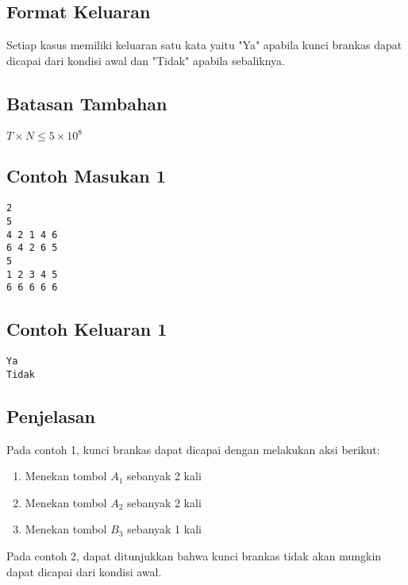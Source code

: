 \documentclass{article}
\begin{document}
\subsection*{Format Keluaran}

Setiap kasus memiliki keluaran satu kata yaitu "Ya" apabila kunci brankas dapat dicapai dari kondisi awal dan "Tidak" apabila sebaliknya.

\subsection*{Batasan Tambahan}
$T \times N \leq 5 \times 10^{8}$

\begin{multicols}{2}
\subsection*{Contoh Masukan 1}
\begin{lstlisting}
2
5
4 2 1 4 6
6 4 2 6 5
5
1 2 3 4 5
6 6 6 6 6
\end{lstlisting}
\columnbreak
\subsection*{Contoh Keluaran 1}
\begin{lstlisting}
Ya
Tidak
\end{lstlisting}
\vfill
\null
\end{multicols}


\subsection*{Penjelasan}

Pada contoh 1, kunci brankas dapat dicapai dengan melakukan aksi berikut:

\begin{enumerate}
\item Menekan tombol $A_1$ sebanyak 2 kali
\item Menekan tombol $A_2$ sebanyak 2 kali
\item Menekan tombol $B_3$ sebanyak 1 kali
\end{enumerate}

Pada contoh 2, dapat ditunjukkan bahwa kunci brankas tidak akan mungkin dapat dicapai dari kondisi awal.
\end{document}
